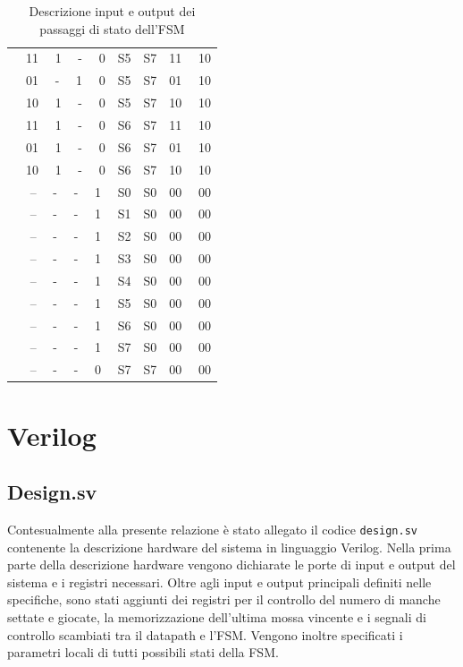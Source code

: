 \documentclass[a4paper]{report}
\begin{document}
\begin{center}
\begin{table}[h]
\begin{tabular}{|c|c|c|c|}
      \cline{1-4} \ \ 
      11 \ \ 1 \ \ - \ \ 0 & S5 & S7 & 11 \ \ 10 \\
      \cline{1-4} \ \ 
      01 \ \ - \ \ 1 \ \ 0 & S5 & S7 & 01 \ \ 10 \\
      \cline{1-4} \ \ 
      10 \ \ 1 \ \ - \ \ 0 & S5 & S7 & 10 \ \ 10 \\
      \cline{1-4} \ \ 
      11 \ \ 1 \ \ - \ \ 0 & S6 & S7 & 11 \ \ 10 \\
      \cline{1-4} \ \ 
      01 \ \ 1 \ \ - \ \ 0 & S6 & S7 & 01 \ \ 10 \\
      \cline{1-4} \ \ 
      10 \ \ 1 \ \ - \ \ 0 & S6 & S7 & 10 \ \ 10 \\
      \cline{1-4} \ \ 
      -- \ \ - \ \ - \ \ 1 & S0 & S0 & 00 \ \ 00 \\
      \cline{1-4} \ \ 
      -- \ \ - \ \ - \ \ 1 & S1 & S0 & 00 \ \ 00 \\
      \cline{1-4} \ \ 
      -- \ \ - \ \ - \ \ 1 & S2 & S0 & 00 \ \ 00 \\
      \cline{1-4} \ \ 
      -- \ \ - \ \ - \ \ 1 & S3 & S0 & 00 \ \ 00 \\
      \cline{1-4} \ \ 
      -- \ \ - \ \ - \ \ 1 & S4 & S0 & 00 \ \ 00 \\
      \cline{1-4} \ \ 
      -- \ \ - \ \ - \ \ 1 & S5 & S0 & 00 \ \ 00 \\
      \cline{1-4} \ \ 
      -- \ \ - \ \ - \ \ 1 & S6 & S0 & 00 \ \ 00 \\
      \cline{1-4} \ \ 
      -- \ \ - \ \ - \ \ 1 & S7 & S0 & 00 \ \ 00 \\
      \cline{1-4} \ \ 
      -- \ \ - \ \ - \ \ 0 & S7 & S7 & 00 \ \ 00 \\
      \cline{1-4}
      \hline
      \end{tabular}
      \caption{Descrizione input e output dei passaggi di stato dell'FSM}
      \label{tab:mealy}
    \end{table}
\end{center}



\chapter{Verilog}
\section{Design.sv}
Contesualmente alla presente relazione è stato allegato il codice \texttt{design.sv} contenente la descrizione hardware del sistema in linguaggio Verilog.
Nella prima parte della descrizione hardware vengono dichiarate le porte di input e output del sistema e i registri necessari.
Oltre agli input e output principali definiti nelle specifiche, sono stati aggiunti dei registri per il controllo del numero di manche settate e giocate, la memorizzazione dell'ultima mossa vincente e i segnali di controllo scambiati tra il datapath e l'FSM.\@
Vengono inoltre specificati i parametri locali di tutti possibili stati della FSM.
\end{document}
